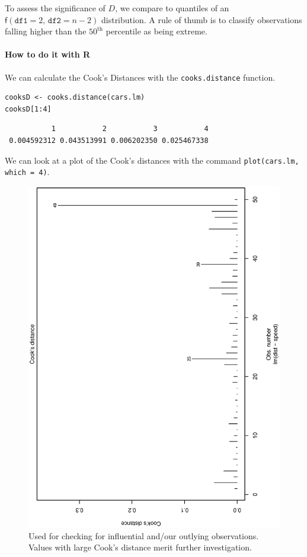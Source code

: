 \documentclass[captions=tableheading]{scrbook}
\begin{document}
To assess the significance of \(D\), we compare to quantiles of an \(\mathsf{f}(\mathtt{df1}=2,\,\mathtt{df2}=n-2)\) distribution. A rule of thumb is to classify observations falling higher than the \(50^{\mathrm{th}}\) percentile as being extreme. 

\paragraph*{How to do it with \textsf{R}}

We can calculate the Cook's Distances with the \texttt{cooks.distance} function.


\begin{verbatim}
cooksD <- cooks.distance(cars.lm)
cooksD[1:4]
\end{verbatim}

\begin{verbatim}
           1           2           3           4 
 0.004592312 0.043513991 0.006202350 0.025467338
\end{verbatim}

We can look at a plot of the Cook's distances with the command \texttt{plot(cars.lm, which = 4)}.

\begin{figure}[th]
  \includegraphics[angle=270, totalheight=4in]{img/Cooks-distance-cars.ps}
  \caption[Cook's distances for the \texttt{cars} data]{\small Used for checking for influential and/our outlying observations. Values with large Cook's distance merit further investigation.}
  \label{fig:Cooks-distance-cars}
\end{figure}
\end{document}
